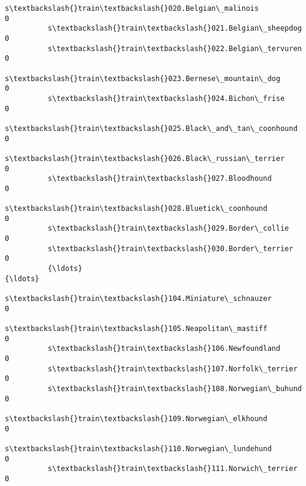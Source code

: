 \documentclass[11pt]{article}
\begin{document}
\begin{Verbatim}[commandchars=\\\{\}]
          s\textbackslash{}train\textbackslash{}020.Belgian\_malinois                                                          0   
          s\textbackslash{}train\textbackslash{}021.Belgian\_sheepdog                                                          0   
          s\textbackslash{}train\textbackslash{}022.Belgian\_tervuren                                                          0   
          s\textbackslash{}train\textbackslash{}023.Bernese\_mountain\_dog                                                      0   
          s\textbackslash{}train\textbackslash{}024.Bichon\_frise                                                              0   
          s\textbackslash{}train\textbackslash{}025.Black\_and\_tan\_coonhound                                                   0   
          s\textbackslash{}train\textbackslash{}026.Black\_russian\_terrier                                                     0   
          s\textbackslash{}train\textbackslash{}027.Bloodhound                                                                0   
          s\textbackslash{}train\textbackslash{}028.Bluetick\_coonhound                                                        0   
          s\textbackslash{}train\textbackslash{}029.Border\_collie                                                             0   
          s\textbackslash{}train\textbackslash{}030.Border\_terrier                                                            0   
          {\ldots}                                                                                 {\ldots}   
          s\textbackslash{}train\textbackslash{}104.Miniature\_schnauzer                                                       0   
          s\textbackslash{}train\textbackslash{}105.Neapolitan\_mastiff                                                        0   
          s\textbackslash{}train\textbackslash{}106.Newfoundland                                                              0   
          s\textbackslash{}train\textbackslash{}107.Norfolk\_terrier                                                           0   
          s\textbackslash{}train\textbackslash{}108.Norwegian\_buhund                                                          0   
          s\textbackslash{}train\textbackslash{}109.Norwegian\_elkhound                                                        0   
          s\textbackslash{}train\textbackslash{}110.Norwegian\_lundehund                                                       0   
          s\textbackslash{}train\textbackslash{}111.Norwich\_terrier                                                           0   

\end{Verbatim}
\end{document}
